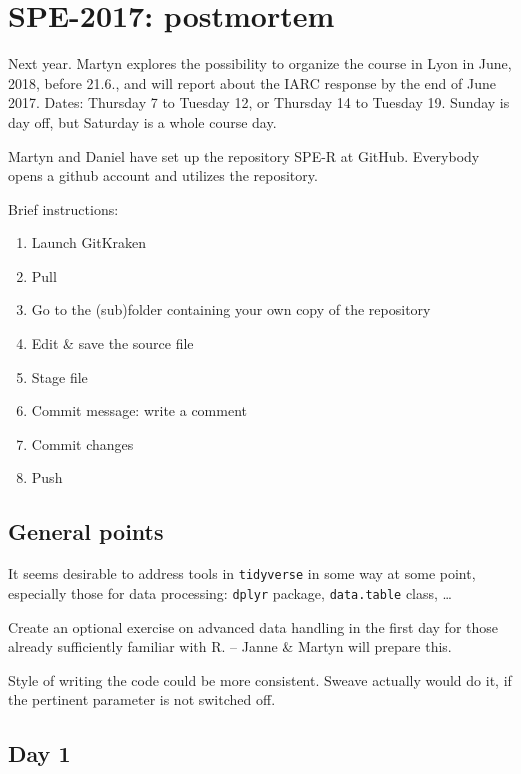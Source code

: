 

\section*{SPE-2017: postmortem}

Next year. Martyn explores the possibility to organize the course 
 in Lyon in June, 2018, before 21.6., and will report about the 
IARC response by the end of June 2017.
Dates: Thursday 7 to Tuesday 12, or Thursday 14 to Tuesday 19.
Sunday is day off, but Saturday is a whole course day. 
 
Martyn and Daniel have set up the repository SPE-R at GitHub.
Everybody opens a github account and utilizes the repository.

Brief instructions:
\begin{enumerate}
\item Launch GitKraken
\item Pull
\item Go to the (sub)folder containing your own copy of the repository
\item Edit \& save the source file
\item Stage file
\item Commit message: write a comment
\item Commit changes
\item Push
\end{enumerate}

\subsection*{General points}

It seems desirable to address tools in {\tt tidyverse} in some way at some point, 
especially those for data processing:
 {\tt dplyr} package, {\tt data.table} class, \dots

Create an optional exercise on advanced data handling 
in the first day for those already sufficiently familiar with R. -- Janne \& Martyn will
prepare this.

Style of writing the code could be more consistent. Sweave actually would do it,
if the pertinent parameter is not switched off.  

\subsection*{Day 1}


